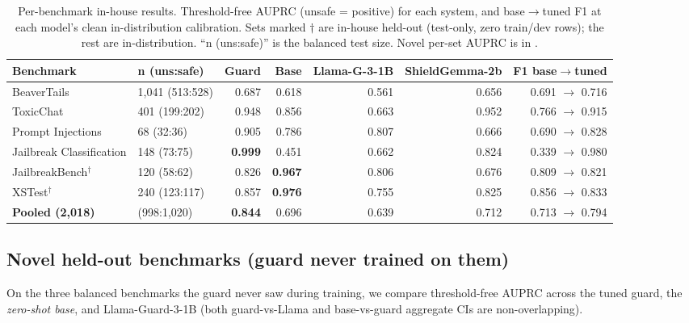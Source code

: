 \documentclass[sigconf,nonacm]{acmart}
\begin{document}
\begin{table}[t]
\centering
\small
\caption{Per-benchmark in-house results. Threshold-free AUPRC (unsafe = positive) for each system, and base$\to$tuned F1 at each model's clean in-distribution calibration. Sets marked $\dagger$ are in-house held-out (test-only, zero train/dev rows); the rest are in-distribution. ``n (uns:safe)'' is the balanced test size. Novel per-set AUPRC is in .}
\label{tab:perbench}
\begin{tabular}{llrrrrr}
\toprule
Benchmark & n (uns:safe) & Guard & Base & Llama-G-3-1B & ShieldGemma-2b & F1 base$\to$tuned \\
\midrule
BeaverTails & 1{,}041 (513:528) & 0.687 & 0.618 & 0.561 & 0.656 & 0.691 $\to$ 0.716 \\
ToxicChat & 401 (199:202) & 0.948 & 0.856 & 0.663 & 0.952 & 0.766 $\to$ 0.915 \\
Prompt Injections & 68 (32:36) & 0.905 & 0.786 & 0.807 & 0.666 & 0.690 $\to$ 0.828 \\
Jailbreak Classification & 148 (73:75) & \textbf{0.999} & 0.451 & 0.662 & 0.824 & 0.339 $\to$ 0.980 \\
JailbreakBench$^\dagger$ & 120 (58:62) & 0.826 & \textbf{0.967} & 0.806 & 0.676 & 0.809 $\to$ 0.821 \\
XSTest$^\dagger$ & 240 (123:117) & 0.857 & \textbf{0.976} & 0.755 & 0.825 & 0.856 $\to$ 0.833 \\
\midrule
\textbf{Pooled (2{,}018)} & (998:1{,}020) & \textbf{0.844} & 0.696 & 0.639 & 0.712 & 0.713 $\to$ 0.794 \\
\bottomrule
\end{tabular}
\end{table}

\subsection{Novel held-out benchmarks (guard never trained on them)}
\label{subsec:novel}

On the three balanced benchmarks the guard never saw during training, we compare threshold-free AUPRC across the tuned guard, the \emph{zero-shot base}, and Llama-Guard-3-1B (both guard-vs-Llama and base-vs-guard aggregate CIs are non-overlapping).
\end{document}
